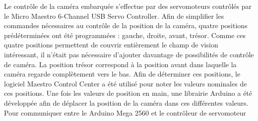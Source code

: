 Le contrôle de la caméra embarquée s’effectue par des servomoteurs contrôlés par le Micro Maestro 6-Channel USB Servo Controller. Afin de simplifier les commandes nécessaires au contrôle de la position de la caméra, quatre positions prédéterminées ont été programmées : gauche, droite, avant, trésor. Comme ces quatre positions permettent de couvrir entièrement le champ de vision intéressant, il n’était pas nécessaire d’ajouter davantage de possibilités de contrôle de caméra. La position trésor correspond à la position avant dans laquelle la caméra regarde complètement vers le bas. Afin de déterminer ces positions, le logiciel Maestro Control Center a été utilisé pour noter les valeurs nominales de ces positions. Une fois les valeurs de position en main, une librairie Arduino a été développée afin de déplacer la position de la caméra dans ces différentes valeurs. Pour communiquer entre le Arduino Mega 2560 et le contrôleur de servomoteur